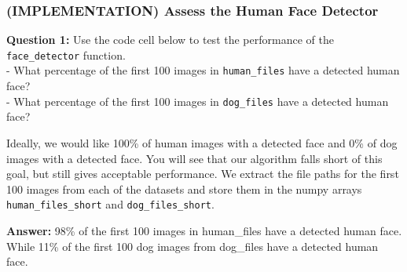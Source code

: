 \documentclass[11pt]{article}
\begin{document}
    \subsubsection{(IMPLEMENTATION) Assess the Human Face
Detector}\label{implementation-assess-the-human-face-detector}

\textbf{Question 1:} Use the code cell below to test the performance of
the \texttt{face\_detector} function.\\
- What percentage of the first 100 images in \texttt{human\_files} have
a detected human face?\\
- What percentage of the first 100 images in \texttt{dog\_files} have a
detected human face?

Ideally, we would like 100\% of human images with a detected face and
0\% of dog images with a detected face. You will see that our algorithm
falls short of this goal, but still gives acceptable performance. We
extract the file paths for the first 100 images from each of the
datasets and store them in the numpy arrays \texttt{human\_files\_short}
and \texttt{dog\_files\_short}.

\textbf{Answer:} 98\% of the first 100 images in human\_files have a
detected human face. While 11\% of the first 100 dog images from
dog\_files have a detected human face.
\end{document}
